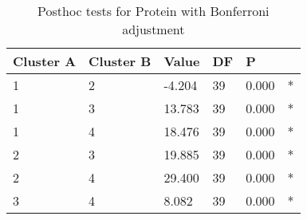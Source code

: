 \begin{table}[h]
\caption{Posthoc tests for Protein with Bonferroni adjustment}
\label{tab:posthoc_Protein}
\begin{tabular}{llllll}
\toprule
Cluster A & Cluster B & Value & DF & P &   \\
\midrule
1 & 2 & -4.204 & 39 & 0.000 & * \\
1 & 3 & 13.783 & 39 & 0.000 & * \\
1 & 4 & 18.476 & 39 & 0.000 & * \\
2 & 3 & 19.885 & 39 & 0.000 & * \\
2 & 4 & 29.400 & 39 & 0.000 & * \\
3 & 4 & 8.082 & 39 & 0.000 & * \\
\bottomrule
\end{tabular}
\end{table}
